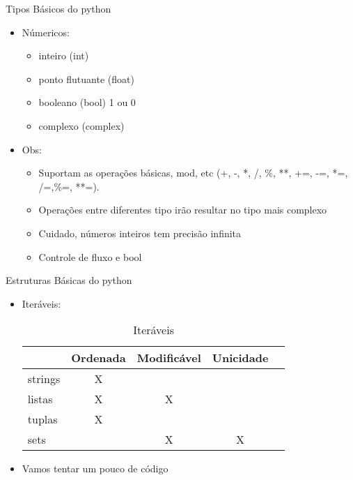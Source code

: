 \begin{frame}{Tipos Básicos do python}
\begin{itemize}
	\item Númericos:
	\begin{itemize}
		\item inteiro (int)
		\item ponto flutuante (float)
		\item booleano (bool) 1 ou 0
		\item complexo (complex)
	\end{itemize}
\end{itemize}
\begin{itemize}
		\item Obs:
		\begin{itemize}
			\item Suportam as operações básicas, mod, etc (+, -, *, /, \%, **, +=, -=, *=, /=,\%=, **=).
			\item Operações entre diferentes tipo irão resultar no tipo mais complexo
			\item Cuidado, números inteiros tem precisão infinita
			\item Controle de fluxo e bool
		\end{itemize}
\end{itemize}
\end{frame}

\begin{frame}{Estruturas Básicas do python}
\begin{itemize}
	\item Iteráveis:
	\begin{table}[]
		\centering
		\caption{Iteráveis}
		\label{my-label}
		\begin{tabular}{|l|c|c|l|l|}
			\hline
			\multicolumn{1}{|c|}{} & Ordenada              & Modificável           & \multicolumn{1}{c|}{Unicidade}  \\ \hline
			strings                   & \multicolumn{0}{c|}{X} &                           &                       \\ \hline
			listas                 & X                     & X                     &                                          \\ \hline
			tuplas                 & X                     & \multicolumn{1}{l|}{} &                    \\ \hline
			sets                   & \multicolumn{1}{l|}{} & X                     & \multicolumn{1}{c|}{X}                             \\ \hline
		\end{tabular}
	\end{table}
	\item Vamos tentar um pouco de código
\end{itemize}
		\textbf{}
\end{frame}

